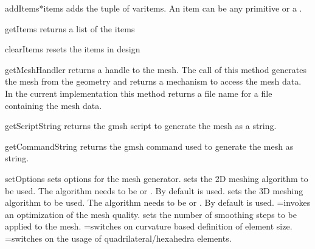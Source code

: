 \begin{methoddesc}[Design]{addItems}{*items}
adds the tuple of var{items}. An item can be any primitive or a .
\end{methoddesc}

\begin{methoddesc}[Design]{getItems}{}
returns a list of the items
\end{methoddesc}

\begin{methoddesc}[Design]{clearItems}{}
resets the items in design
\end{methoddesc}

\begin{methoddesc}[Design]{getMeshHandler}{}
returns a handle to the mesh. The call of this method generates the mesh from the geometry and
returns a mechanism to access the mesh data. In the current implementation this
method returns a file name for a file containing the mesh data.
\end{methoddesc}

\begin{methoddesc}[Design]{getScriptString}{}
returns the gmsh script to generate the mesh as a string.
\end{methoddesc}

\begin{methoddesc}[Design]{getCommandString}{}
returns the gmsh command used to generate the mesh as string.
\end{methoddesc}

\begin{methoddesc}[Design]{setOptions}{
}
sets options for the mesh generator.  sets the 2D meshing algorithm to be used.
The algorithm needs to be 
or . By default  is used. 
 sets the 3D  meshing algorithm to be used.
The algorithm needs to be 
or 
. By default  is used.
=\True invokes an optimization of the mesh quality.
 sets the number of smoothing steps to be applied to the mesh.  
=\True switches on curvature based definition of element size.
=\True switches on the usage of quadrilateral/hexahedra elements.
\end{methoddesc}

